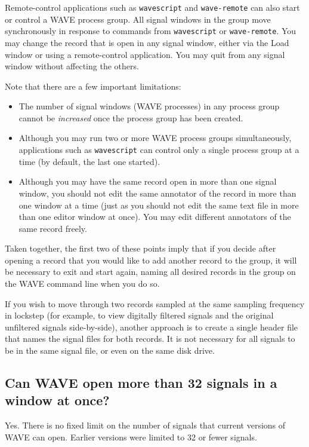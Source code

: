 \documentclass[twoside]{book}
\newcommand{\WAVE}{{\sf WAVE}\xspace}
\begin{document}
Remote-control applications such as {\tt wavescript} and {\tt wave-remote} can
also start or control a \WAVE{} process group.  All signal windows in the
group move synchronously in response to commands from {\tt wavescript} or
{\tt wave-remote}.  You may change the record that is open in any signal
window, either via the {\sf Load} window or using a remote-control application.
You may quit from any signal window without affecting the others.

Note that there are a few important limitations:
\begin{itemize}
\item
The number of signal windows (\WAVE{} processes) in any process group cannot
be \emph{increased} once the process group has been created.  

\item
Although you may run two or more \WAVE{} process groups simultaneously,
applications such as {\tt wavescript} can control only a single process group
at a time (by default, the last one started).

\item
Although you may have the same record open in more than one signal window, you
should not edit the same annotator of the record in more than one window at a
time (just as you should not edit the same text file in more than one editor
window at once).  You may edit different annotators of the same record
freely.
\end{itemize}

Taken together, the first two of these points imply that if you decide after
opening a record that you would like to add another record to the group, it
will be necessary to exit and start again, naming all desired records in the
group on the \WAVE{} command line when you do so.

If you wish to move through two records sampled at the same sampling
frequency in lockstep (for example, to view digitally filtered signals
and the original unfiltered signals side-by-side), another approach is
to create a single header file that names the signal files for both
records.  It is not necessary for all signals to be in the same signal
file, or even on the same disk drive.

\subsection{Can \WAVE{} open more than 32 signals in a window at once?}

Yes.  There is no fixed limit on the number of signals that current versions
of \WAVE{} can open.  Earlier versions were limited to 32 or fewer signals.
\end{document}
